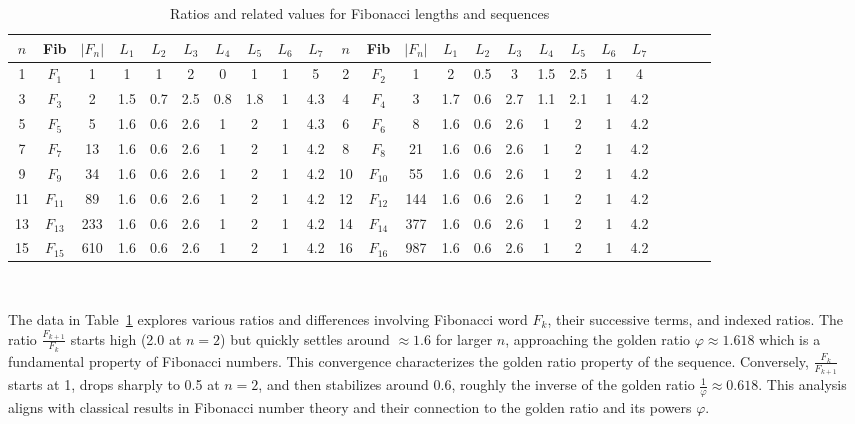 \documentclass[11pt, a4paper]{article}
\theoremstyle{definition}
\begin{document}
\begin{table}[H]
\centering
\small
\begin{tabular}{|c|c|c|c|c|c|c|c|c|c||c|c|c|c|c|c|c|c|c|c|c|c|c|c|}
\hline
$n$ & Fib & $|F_n|$ & $L_1$ & $L_2$ & $L_3$ & $L_4$ & $L_5$ & $L_6$ & $L_7$ & $n$ & Fib & $|F_n|$ & $L_1$ & $L_2$ & $L_3$ & $L_4$ & $L_5$ & $L_6$ & $L_7$\\
\hline
1 & $F_1$ & 1 & 1 & 1 & 2 & 0 & 1 & 1 & 5 & 2 & $F_2$ & 1 & 2 & 0.5 & 3 & 1.5 & 2.5 & 1 & 4 \\ \hline
3 & $F_3$ & 2 & 1.5 & 0.7 & 2.5 & 0.8 & 1.8 & 1 & 4.3 & 4 & $F_4$ & 3 & 1.7 & 0.6 & 2.7 & 1.1 & 2.1 & 1 & 4.2 \\\hline
5 &$ F_5$ & 5 & 1.6 & 0.6 & 2.6 & 1 & 2 & 1 & 4.3 & 6 & $F_6$ & 8 & 1.6 & 0.6 & 2.6 & 1 & 2 & 1 & 4.2 \\\hline
7 & $F_7$ & 13 & 1.6 & 0.6 & 2.6 & 1 & 2 & 1 & 4.2 & 8 & $F_8$ & 21 & 1.6 & 0.6 & 2.6 & 1 & 2 & 1 & 4.2 \\\hline
9 & $F_9$ & 34 & 1.6 & 0.6 & 2.6 & 1 & 2 & 1 & 4.2 & 10 & $F_10$ & 55 & 1.6 & 0.6 & 2.6 & 1 & 2 & 1 & 4.2 \\\hline
11 & $F_{11}$ & 89 & 1.6 & 0.6 & 2.6 & 1 & 2 & 1 & 4.2 & 12 & $F_{12}$ & 144 & 1.6 & 0.6 & 2.6 & 1 & 2 & 1 & 4.2 \\\hline
13 & $F_{13}$ & 233 & 1.6 & 0.6 & 2.6 & 1 & 2 & 1 & 4.2 & 14 & $F_{14}$ & 377 & 1.6 & 0.6 & 2.6 & 1 & 2 & 1 & 4.2 \\\hline
15 & $F_{15}$ & 610 & 1.6 & 0.6 & 2.6 & 1 & 2 & 1 & 4.2 & 16 & $F_{16}$ & 987 & 1.6 & 0.6 & 2.6 & 1 & 2 & 1 & 4.2 \\\hline
\end{tabular}
\caption{Ratios and related values for Fibonacci lengths and sequences}~\label{tab1Ratiosjds}
\end{table}
The data in Table~\ref{tab1Ratiosjds} explores various ratios and differences involving Fibonacci word $F_k$, their successive terms, and indexed ratios. The ratio $\frac{F_{k+1}}{F_k}$ starts high (2.0 at $n=2$) but quickly settles around $\approx 1.6$ for larger $n$, approaching the golden ratio $\varphi \approx 1.618$ which is a fundamental property of Fibonacci numbers. This convergence characterizes the golden ratio property of the sequence.  Conversely, $\frac{F_k}{F_{k+1}}$ starts at 1, drops sharply to 0.5 at $n=2$, and then stabilizes around 0.6, roughly the inverse of the golden ratio $\frac{1}{\varphi} \approx 0.618$. This analysis aligns with classical results in Fibonacci number theory and their connection to the golden ratio and its powers $\varphi$.
\end{document}
